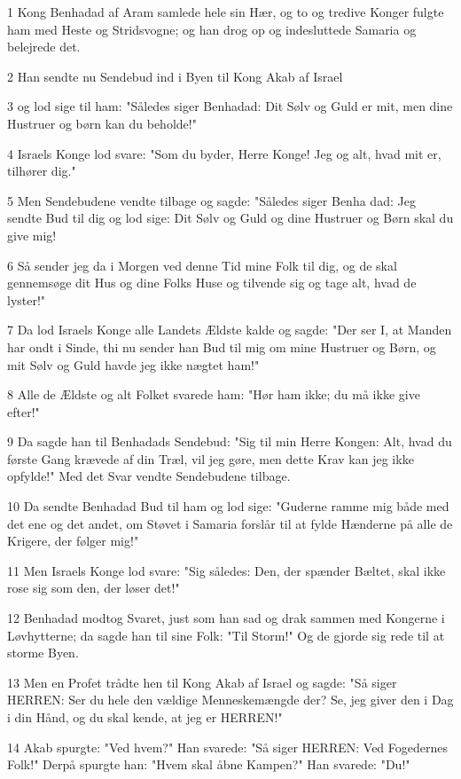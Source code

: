 \par 1 Kong Benhadad af Aram samlede hele sin Hær, og to og tredive Konger fulgte ham med Heste og Stridsvogne; og han drog op og indesluttede Samaria og belejrede det.
\par 2 Han sendte nu Sendebud ind i Byen til Kong Akab af Israel
\par 3 og lod sige til ham: "Således siger Benhadad: Dit Sølv og Guld er mit, men dine Hustruer og børn kan du beholde!"
\par 4 Israels Konge lod svare: "Som du byder, Herre Konge! Jeg og alt, hvad mit er, tilhører dig."
\par 5 Men Sendebudene vendte tilbage og sagde: "Således siger Benha dad: Jeg sendte Bud til dig og lod sige: Dit Sølv og Guld og dine Hustruer og Børn skal du give mig!
\par 6 Så sender jeg da i Morgen ved denne Tid mine Folk til dig, og de skal gennemsøge dit Hus og dine Folks Huse og tilvende sig og tage alt, hvad de lyster!"
\par 7 Da lod Israels Konge alle Landets Ældste kalde og sagde: "Der ser I, at Manden har ondt i Sinde, thi nu sender han Bud til mig om mine Hustruer og Børn, og mit Sølv og Guld havde jeg ikke nægtet ham!"
\par 8 Alle de Ældste og alt Folket svarede ham: "Hør ham ikke; du må ikke give efter!"
\par 9 Da sagde han til Benhadads Sendebud: "Sig til min Herre Kongen: Alt, hvad du første Gang krævede af din Træl, vil jeg gøre, men dette Krav kan jeg ikke opfylde!" Med det Svar vendte Sendebudene tilbage.
\par 10 Da sendte Benhadad Bud til ham og lod sige: "Guderne ramme mig både med det ene og det andet, om Støvet i Samaria forslår til at fylde Hænderne på alle de Krigere, der følger mig!"
\par 11 Men Israels Konge lod svare: "Sig således: Den, der spænder Bæltet, skal ikke rose sig som den, der løser det!"
\par 12 Benhadad modtog Svaret, just som han sad og drak sammen med Kongerne i Løvhytterne; da sagde han til sine Folk: "Til Storm!" Og de gjorde sig rede til at storme Byen.
\par 13 Men en Profet trådte hen til Kong Akab af Israel og sagde: "Så siger HERREN: Ser du hele den vældige Menneskemængde der? Se, jeg giver den i Dag i din Hånd, og du skal kende, at jeg er HERREN!"
\par 14 Akab spurgte: "Ved hvem?" Han svarede: "Så siger HERREN: Ved Fogedernes Folk!" Derpå spurgte han: "Hvem skal åbne Kampen?" Han svarede: "Du!"
